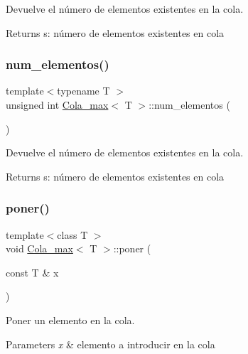 Devuelve el número de elementos existentes en la cola. 

\begin{DoxyReturn}{Returns}
s\+: número de elementos existentes en cola 
\end{DoxyReturn}
\mbox{\label{class_cola__max_aa3ece318ef28ed910c378f33e9a1d172}} 
\subsubsection{\texorpdfstring{num\+\_\+elementos()}{num\_elementos()}\hspace{0.1cm}{\footnotesize\ttfamily [2/2]}}
{\footnotesize\ttfamily template$<$typename T $>$ \\
unsigned int \mbox{\hyperlink{class_cola__max}{Cola\+\_\+max}}$<$ T $>$\+::num\+\_\+elementos (\begin{DoxyParamCaption}{ }\end{DoxyParamCaption})}



Devuelve el número de elementos existentes en la cola. 

\begin{DoxyReturn}{Returns}
s\+: número de elementos existentes en cola 
\end{DoxyReturn}
\mbox{\label{class_cola__max_a7cf38998ed54e19bf698fb4180cf4506}} 
\subsubsection{\texorpdfstring{poner()}{poner()}\hspace{0.1cm}{\footnotesize\ttfamily [1/2]}}
{\footnotesize\ttfamily template$<$class T $>$ \\
void \mbox{\hyperlink{class_cola__max}{Cola\+\_\+max}}$<$ T $>$\+::poner (\begin{DoxyParamCaption}\item[{const T \&}]{x }\end{DoxyParamCaption})}



Poner un elemento en la cola. 


\begin{DoxyParams}{Parameters}
{\em x} & elemento a introducir en la cola \\
\hline
\end{DoxyParams}
\mbox{\label{class_cola__max_ad890c67350050045a6531e2c84baacbb}} 
